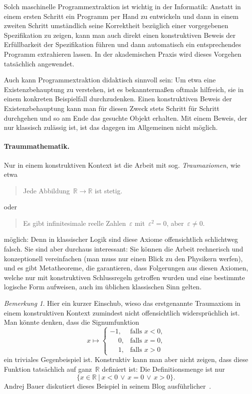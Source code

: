 \documentclass[a4paper,ngerman,12pt]{scrartcl}
\theoremstyle{definition}
\theoremstyle{plain}
\theoremstyle{remark}
\newtheorem{bem}[defn]{Bemerkung}
\newcommand{\RR}{\mathbb{R}}
\renewcommand{\_}{\mathpunct{.}\,}
\newcommand{\?}{\,{:}\,}
\begin{document}
Solch maschinelle
Programmextraktion ist wichtig in der Informatik: Anstatt in einem ersten
Schritt ein Programm per Hand zu entwickeln und dann in einem zweiten
Schritt umständlich seine Korrektheit bezüglich einer vorgegebenen
Spezifikation zu zeigen, kann man auch direkt einen konstruktiven Beweis der
Erfüllbarkeit der Spezifikation führen und dann automatisch ein entsprechendes
Programm extrahieren lassen. In der akademischen Praxis wird dieses Vorgehen
tatsächlich angewendet.

Auch kann Programmextraktion didaktisch sinnvoll sein: Um etwa eine
Existenzbehauptung zu verstehen, ist es bekanntermaßen oftmals hilfreich, sie in einem konkreten
Beispielfall durchzudenken. Einen konstruktiven Beweis der Existenzbehauptung
kann man für diesen Zweck stets Schritt für Schritt durchgehen und so am Ende das gesuchte
Objekt erhalten. Mit einem Beweis, der nur klassisch zulässig ist, ist das
dagegen im Allgemeinen nicht möglich.

\paragraph{Traummathematik.} Nur in einem konstruktiven Kontext ist die Arbeit
mit sog. \emph{Traum\-axio\-men}, wie etwa
\begin{quote}Jede Abbildung~$\RR \to \RR$ ist stetig.\end{quote}
oder
\begin{quote}Es gibt infinitesimale reelle Zahlen~$\varepsilon$
mit~$\varepsilon^2 = 0$, aber~$\varepsilon \neq 0$.\end{quote}
möglich: Denn in klassischer Logik sind diese Axiome offensichtlich schlichtweg
falsch. Sie sind aber durchaus interessant: Sie können die Arbeit
rechnerisch und konzeptionell vereinfachen (man muss nur einen Blick zu den
Physikern werfen), und es gibt Metatheoreme, die garantieren, dass Folgerungen
aus diesen Axiomen, welche nur mit konstruktiven Schlussregeln getroffen wurden
und eine bestimmte logische Form aufweisen, auch im üblichen klassischen Sinn
gelten.

\begin{bem}Hier ein kurzer Einschub, wieso das erstgenannte Traumaxiom
in einem konstruktiven Kontext zumindest nicht offensichtlich widersprüchlich
ist. Man könnte denken, dass die Signumfunktion
\[ x \longmapsto \begin{cases}
  -1, & \text{falls $x < 0$,} \\
  \phantom{+}0, & \text{falls $x = 0$,} \\
  \phantom{+}1, & \text{falls $x > 0$}
\end{cases} \]
ein triviales Gegenbeispiel ist. Konstruktiv kann man aber nicht zeigen, dass
diese Funktion tatsächlich auf ganz~$\RR$ definiert ist: Die Definitionsmenge
ist nur
\[ \{ x \in \RR \ |\  x < 0 \,\vee\, x = 0 \,\vee\, x > 0 \}. \]
Andrej Bauer diskutiert dieses Beispiel in seinem Blog
ausführlicher~\cite{bauer:blog:stetigkeit}.
\end{bem}
\end{document}
